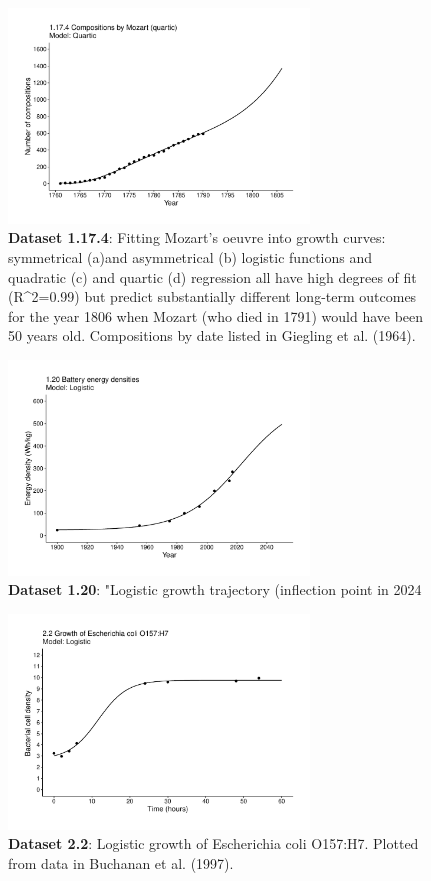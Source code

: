 \documentclass[aps,rmp,preprint,superscriptaddress,10pt,onecolumn]{article}
\begin{document}
\begin{figure}[h]
\includegraphics[width=8cm]{output/figs-ggplot/1.17.4.pdf}
\caption{\textbf{Dataset 1.17.4}: Fitting Mozart's oeuvre into growth curves: symmetrical (a)and asymmetrical (b) logistic functions and quadratic (c) and quartic (d) regression all have high degrees of fit (R^2=0.99) but predict substantially different long-term outcomes for the year 1806 when Mozart (who died in 1791) would have been 50 years old. Compositions by date listed in Giegling et al. (1964).}
\end{figure}
	
\begin{figure}[h]
\includegraphics[width=8cm]{output/figs-ggplot/1.20.pdf}
\caption{\textbf{Dataset 1.20}: "Logistic growth trajectory (inflection point in 2024}
\end{figure}
	
\begin{figure}[h]
\includegraphics[width=8cm]{output/figs-ggplot/2.2.pdf}
\caption{\textbf{Dataset 2.2}: Logistic growth of Escherichia coli O157:H7. Plotted from data in Buchanan et al. (1997).}
\end{figure}
	
\end{document}
